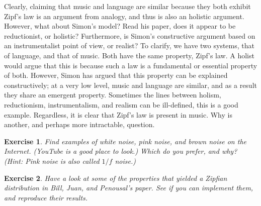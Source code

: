 \documentclass[10pt]{book}
\newtheorem{exercise}{Exercise}[chapter]
\begin{document}
Clearly, claiming that music and language are similar because they both exhibit Zipf's law is an argument from analogy, and thus is also an holistic argument. However, what about Simon's model? Read his paper, does it appear to be reductionist, or holistic? Furthermore, is Simon's constructive argument based on an instrumentalist point of view, or realist? To clarify, we have two systems, that of language, and that of music. Both have the same property, Zipf's law. A holist would argue that this is because such a law is a fundamental or essential property of both. However, Simon has argued that this property can be explained constructively; at a very low level, music and language are similar, and as a result they share an emergent property. Sometimes the lines between holism, reductionism, instrumentalism, and realism can be ill-defined, this is a good example. Regardless, it is clear that Zipf's law is present in music. Why is another, and perhaps more intractable, question.

\begin{exercise}
Find examples of white noise, pink noise, and brown noise on the Internet. (YouTube is a good place to look.) Which do you prefer, and why? (Hint: Pink noise is also called $1/f$ noise.)
\end{exercise}

\begin{exercise}
Have a look at some of the properties that yielded a Zipfian distribution in Bill, Juan, and Penousal's paper. See if you can implement them, and reproduce their results.
\end{exercise}
\end{document}
